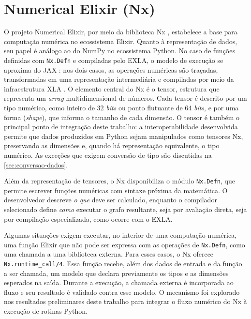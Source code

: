 \section{Numerical Elixir (Nx)}\label{sec:numerical-elixir}

O projeto Numerical Elixir, por meio da biblioteca \gls{Nx} \citep{nx2024}, estabelece a base para computação numérica no ecossistema Elixir. Quanto à representação de dados, seu papel é análogo ao do NumPy \citep{harris2020} no ecossistema Python. No caso de funções definidas com \texttt{Nx.Defn} e compiladas pelo \gls{EXLA}, o modelo de execução se aproxima do JAX \citep{jax2024}: nos dois casos, as operações numéricas são traçadas, transformadas em uma representação intermediária e compiladas por meio da infraestrutura \gls{XLA} \citep{xla2024}. O elemento central do \gls{Nx} é o tensor, estrutura que representa um \textit{array} multidimensional de números. Cada tensor é descrito por um tipo numérico, como inteiro de 32 \textit{bits} ou ponto flutuante de 64 \textit{bits}, e por uma forma (\textit{shape}), que informa o tamanho de cada dimensão. O tensor é também o principal ponto de integração deste trabalho: a interoperabilidade desenvolvida permite que dados produzidos em Python sejam manipulados como tensores \gls{Nx}, preservando as dimensões e, quando há representação equivalente, o tipo numérico. As exceções que exigem conversão de tipo são discutidas na \autoref{sec:conversao-dados}.

Além da representação de tensores, o \gls{Nx} disponibiliza o módulo \texttt{Nx.Defn}, que permite escrever funções numéricas com sintaxe próxima da matemática. O desenvolvedor descreve \textit{o que} deve ser calculado, enquanto o compilador selecionado define \textit{como} executar o grafo resultante, seja por avaliação direta, seja por compilação especializada, como ocorre com o \gls{EXLA}.

Algumas situações exigem executar, no interior de uma computação numérica, uma função Elixir que não pode ser expressa com as operações de \texttt{Nx.Defn}, como uma chamada a uma biblioteca externa. Para esses casos, o \gls{Nx} oferece \texttt{Nx.runtime\_call/4}. Essa função recebe, além dos dados de entrada e da função a ser chamada, um modelo que declara previamente os tipos e as dimensões esperados na saída. Durante a execução, a chamada externa é incorporada ao fluxo e seu resultado é validado contra esse modelo. O mecanismo foi explorado nos resultados preliminares deste trabalho para integrar o fluxo numérico do \gls{Nx} à execução de rotinas Python.


